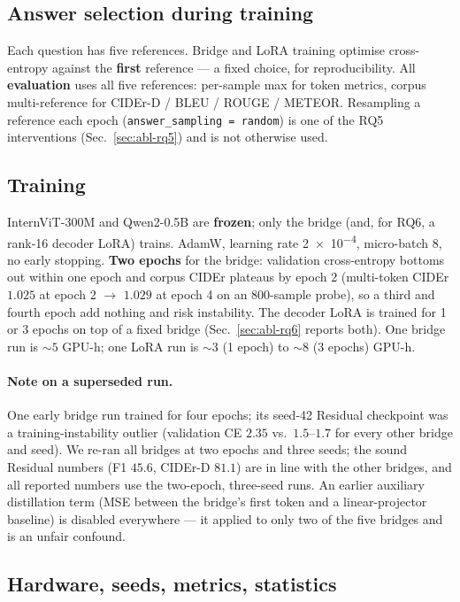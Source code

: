 \subsection{Answer selection during training}

Each question has five references. Bridge and LoRA training optimise cross-entropy
against the \textbf{first} reference --- a fixed choice, for reproducibility. All
\textbf{evaluation} uses all five references: per-sample max for token metrics,
corpus multi-reference for CIDEr-D / BLEU / ROUGE / METEOR. Resampling a reference
each epoch (\texttt{answer\_sampling = random}) is one of the RQ5 interventions
(Sec.~\ref{sec:abl-rq5}) and is not otherwise used.

\subsection{Training}

InternViT-300M and Qwen2-0.5B are \textbf{frozen}; only the bridge (and, for RQ6,
a rank-16 decoder LoRA) trains. AdamW, learning rate \num{2e-4}, micro-batch 8, no
early stopping. \textbf{Two epochs} for the bridge: validation cross-entropy
bottoms out within one epoch and corpus CIDEr plateaus by epoch 2 (multi-token
CIDEr $1.025$ at epoch 2 $\rightarrow$ $1.029$ at epoch 4 on an 800-sample
probe), so a third and fourth epoch add nothing and risk instability. The decoder
LoRA is trained for 1 or 3 epochs on top of a fixed bridge
(Sec.~\ref{sec:abl-rq6} reports both). One bridge run is ${\sim}5$ GPU-h; one
LoRA run is ${\sim}3$ (1 epoch) to ${\sim}8$ (3 epochs) GPU-h.

\paragraph{Note on a superseded run.}
One early bridge run trained for four epochs; its seed-42 Residual checkpoint was
a training-instability outlier (validation CE $2.35$ vs.\ $1.5$--$1.7$ for every
other bridge and seed). We re-ran all bridges at two epochs and three seeds; the
sound Residual numbers (F1 $45.6$, CIDEr-D $81.1$) are in line with the other
bridges, and all reported numbers use the two-epoch, three-seed runs. An earlier
auxiliary distillation term (MSE between the bridge's first token and a
linear-projector baseline) is disabled everywhere --- it applied to only two of
the five bridges and is an unfair confound.

\subsection{Hardware, seeds, metrics, statistics}
\label{sec:setup-hw}

